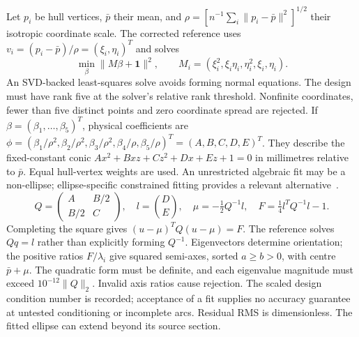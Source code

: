 \documentclass[11pt,a4paper]{article}
\begin{document}
Let $p_i$ be hull vertices, $\bar p$ their mean, and
$\rho=[n^{-1}\sum_i\|p_i-\bar p\|^2]^{1/2}$ their isotropic coordinate scale.
The corrected reference uses $v_i=(p_i-\bar p)/\rho=(\xi_i,\eta_i)^T$ and solves
\begin{equation}
 \min_\beta\|M\beta+\mathbf1\|^2,\qquad
 M_i=(\xi_i^2,\xi_i\eta_i,\eta_i^2,\xi_i,\eta_i).
 \label{eq:fit}
\end{equation}
An SVD-backed least-squares solve avoids forming normal equations. The design must have rank five at the solver's relative rank threshold. Nonfinite coordinates, fewer than five distinct points and zero coordinate spread are rejected. If $\beta=(\beta_1,\ldots,\beta_5)^T$, physical coefficients are
$\phi=(\beta_1/\rho^2,\beta_2/\rho^2,\beta_3/\rho^2,\beta_4/\rho,\beta_5/\rho)^T=(A,B,C,D,E)^T$.
They describe the fixed-constant conic $Ax^2+Bxz+Cz^2+Dx+Ez+1=0$ in millimetres relative to $\bar p$. Equal hull-vertex weights are used. An unrestricted algebraic fit may be a non-ellipse; ellipse-specific constrained fitting provides a relevant alternative~\cite{fitzgibbon1999direct}.
\begin{equation}
 Q=\begin{pmatrix}A&B/2\\B/2&C\end{pmatrix},\quad l=\binom DE,
 \quad \mu=-\tfrac12Q^{-1}l,\quad
 F=\tfrac14l^TQ^{-1}l-1.
 \label{eq:recover}
\end{equation}
Completing the square gives $(u-\mu)^TQ(u-\mu)=F$. The reference solves $Qq=l$ rather than explicitly forming $Q^{-1}$. Eigenvectors determine orientation; the positive ratios $F/\lambda_i$ give squared semi-axes, sorted $a\geq b>0$, with centre $\bar p+\mu$. The quadratic form must be definite, and each eigenvalue magnitude must exceed $10^{-12}\|Q\|_2$. Invalid axis ratios cause rejection. The scaled design condition number is recorded; acceptance of a fit supplies no accuracy guarantee at untested conditioning or incomplete arcs. Residual RMS is dimensionless. The fitted ellipse can extend beyond its source section.
\end{document}
